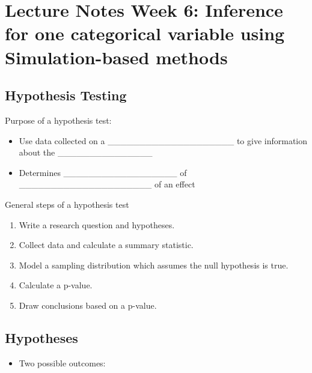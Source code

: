 \documentclass[
]{report}
\providecommand{\tightlist}{%
  \setlength{\itemsep}{0pt}\setlength{\parskip}{0pt}}
\begin{document}
\newpage

\hypertarget{lecture-notes-week-6-inference-for-one-categorical-variable-using-simulation-based-methods}{%
\section{Lecture Notes Week 6: Inference for one categorical variable using Simulation-based methods}\label{lecture-notes-week-6-inference-for-one-categorical-variable-using-simulation-based-methods}}


\hypertarget{hypothesis-testing}{%
\subsection{Hypothesis Testing}\label{hypothesis-testing}}

Purpose of a hypothesis test:

\begin{itemize}
\item
  Use data collected on a \_\_\_\_\_\_\_\_\_\_\_\_\_\_\_\_\_\_\_\_ to give information about the \_\_\_\_\_\_\_\_\_\_\_\_\_\_\_
\item
  Determines \_\_\_\_\_\_\_\_\_\_\_\_\_\_\_\_\_\_ of \_\_\_\_\_\_\_\_\_\_\_\_\_\_\_\_\_\_\_\_\_ of an effect
\end{itemize}

General steps of a hypothesis test

\begin{enumerate}
\def\labelenumi{\arabic{enumi}.}
\item
  Write a research question and hypotheses.
\item
  Collect data and calculate a summary statistic.
\item
  Model a sampling distribution which assumes the null hypothesis is true.
\item
  Calculate a p-value.
\item
  Draw conclusions based on a p-value.
\end{enumerate}

\hypertarget{hypotheses}{%
\subsection*{Hypotheses}\label{hypotheses}}

\begin{itemize}
\tightlist
\item
  Two possible outcomes:
\end{itemize}
\end{document}
